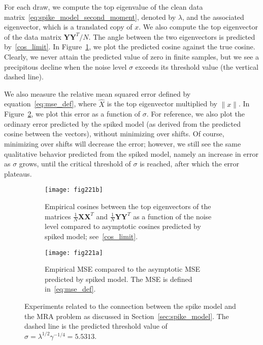 \documentclass{IEEEtran}
\numberwithin{equation}{section}
\numberwithin{figure}{section}
\theoremstyle{plain}
\theoremstyle{definition}
\theoremstyle{remark}
\theoremstyle{plain}
\theoremstyle{remark}
\theoremstyle{plain}
\theoremstyle{plain}
\theoremstyle{remark}
\newcommand{\Y}{\mathbf{Y}}
\newcommand{\X}{\mathbf{X}}
\begin{document}
For each draw, we compute the top eigenvalue of the clean data matrix~\eqref{eq:spike_model_second_moment}, denoted by $\lambda$, and the associated eigenvector, which is a translated copy of $x$. We also compute the top eigenvector of the data matrix $\Y \Y^T / N$. The angle between the two eigenvectors is predicted by~\eqref{cos_limit}. In Figure~\ref{fig:spike_cosine}, we plot the predicted cosine against the true cosine. Clearly, we never attain the predicted value of zero in finite samples, but we see a precipitous decline when the noise level $\sigma$ exceeds its threshold value (the vertical dashed line).

We also measure the relative mean squared error defined by equation~\eqref{eq:mse_def}, where $\widehat{X}$ is the top eigenvector multiplied by $\|x\|$. In Figure~\ref{fig:spike_mse}, we plot this error as a function of $\sigma$. For reference, we also plot the ordinary error predicted by the spiked model (as derived from the predicted cosine between the vectors), without minimizing over shifts. Of course, minimizing over shifts will decrease the error; however, we still see the same qualitative behavior predicted from the spiked model, namely an increase in error as $\sigma$ grows, until the critical threshold of $\sigma$ is reached, after which the error plateaus.

%
%
\begin{figure*}
\centering 
    \begin{subfigure}{0.43\textwidth} 
            \begin{center}
             \texttt{[image: fig221b]}
\caption{ \label{fig:spike_cosine} Empirical cosines between the top eigenvectors of the matrices $\frac{1}{N} \X \X^T$ and $\frac{1}{N} \Y \Y^T$ as a function of the noise level compared to asymptotic cosines predicted by spiked model; see~\eqref{cos_limit}.}            
\end{center}
    \end{subfigure} \quad
        \begin{subfigure}{0.43\textwidth} 
        \begin{center}
            \texttt{[image: fig221a]}
            \caption{\label{fig:spike_mse} Empirical MSE compared to the asymptotic MSE predicted by spiked model. The MSE is defined in~\eqref{eq:mse_def}.} 
        \end{center}
    \end{subfigure} 
    \caption{    \label{fig-compare-spiked} Experiments related to the connection between the spike model and the MRA problem as discussed in Section~\ref{sec:spike_model}. The dashed line is the predicted threshold value of $\sigma = \lambda^{1/2}\gamma^{-1/4}= 5.5313$.}
\end{figure*}
\end{document}
